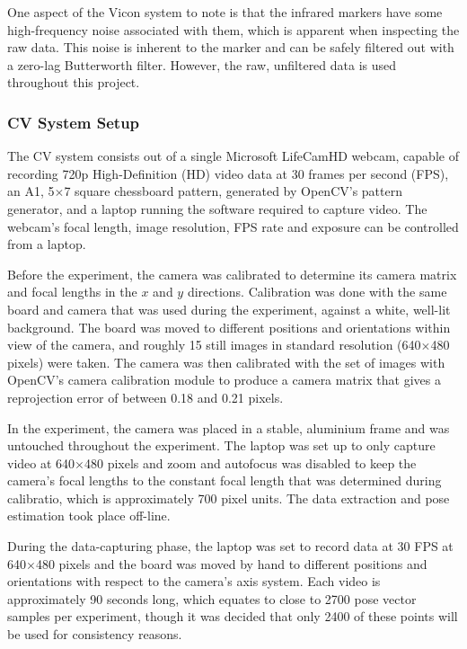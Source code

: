 One aspect of the Vicon system to note is that the infrared markers have some high-frequency noise associated with them, which is apparent when inspecting the raw data. This noise is inherent to the marker and can be safely filtered out with a zero-lag Butterworth filter. However, the raw, unfiltered data is used throughout this project. 

\subsubsection{CV System Setup}

The CV system consists out of a single Microsoft LifeCamHD webcam, capable of recording 720p High-Definition (HD) video data at 30 frames per second (FPS), an A1, 5$\times$7 square chessboard pattern, generated by OpenCV's pattern generator, and a laptop running the software required to capture video. The webcam's focal length, image resolution, FPS rate and exposure can be controlled from a laptop. 

Before the experiment, the camera was calibrated to determine its camera matrix and focal lengths in the $x$ and $y$ directions. Calibration was done with the same board and camera that was used during the experiment, against a white, well-lit background. The board was moved to different positions and orientations within view of the camera, and roughly 15 still images in  standard resolution (640$\times$480 pixels) were taken. The camera was then calibrated with the set of images with OpenCV's camera calibration module to produce a camera matrix that gives a reprojection error of between 0.18 and 0.21 pixels. 

In the experiment, the camera was placed in a stable, aluminium frame and was untouched throughout the experiment. The laptop was set up to only capture video at 640$\times$480 pixels and zoom and autofocus was disabled to keep the camera's focal lengths to the constant focal length that was determined during calibratio, which is approximately 700 pixel units. The data extraction and pose estimation took place off-line. 

During the data-capturing phase, the laptop was set to record data at 30 FPS at 640$\times$480 pixels and the board was moved by hand to different positions and orientations with respect to the camera's axis system. Each video is approximately 90 seconds long, which equates to close to 2700 pose vector samples per experiment, though it was decided that only 2400 of these points will be used for consistency reasons. 

